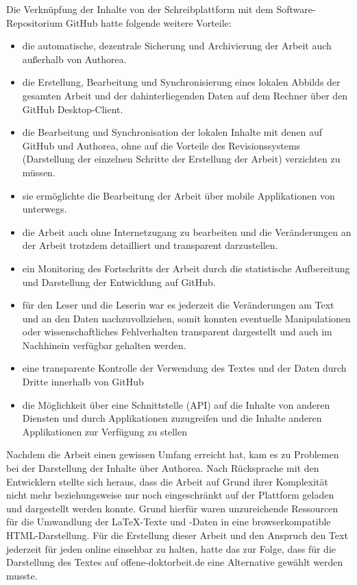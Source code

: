 Die Verknüpfung der Inhalte von der Schreibplattform mit dem Software-Repositorium GitHub hatte folgende weitere Vorteile:
\begin{itemize}
\item die automatische, dezentrale Sicherung und Archivierung der Arbeit auch außerhalb von Authorea.
\item die Erstellung, Bearbeitung und Synchronisierung eines lokalen Abbilds der gesamten Arbeit und der dahinterliegenden Daten auf dem Rechner über den GitHub Desktop-Client.
\item die Bearbeitung und Synchronisation der lokalen Inhalte mit denen auf GitHub und Authorea, ohne auf die Vorteile des Revisionssystems (Darstellung der einzelnen Schritte der Erstellung der Arbeit) verzichten zu müssen.
\item sie ermöglichte die Bearbeitung der Arbeit über mobile Applikationen von unterwegs.
\item die Arbeit auch ohne Internetzugang zu bearbeiten und die Veränderungen an der Arbeit trotzdem detailliert und transparent darzustellen.
\item ein Monitoring des Fortschritts der Arbeit durch die statistische Aufbereitung und Darstellung der Entwicklung auf GitHub.
\item für den Leser und die Leserin war es jederzeit die Veränderungen am Text und an den Daten nachzuvollziehen, somit konnten eventuelle Manipulationen oder wissenschaftliches Fehlverhalten transparent dargestellt und auch im Nachhinein verfügbar gehalten werden.
\item eine transparente Kontrolle der Verwendung des Textes und der Daten durch Dritte innerhalb von GitHub
\item die Möglichkeit über eine Schnittstelle (API) auf die Inhalte von anderen Diensten und durch Applikationen zuzugreifen und die Inhalte anderen Applikationen zur Verfügung zu stellen
\end{itemize}

Nachdem die Arbeit einen gewissen Umfang erreicht hat, kam es zu Problemen bei der Darstellung der Inhalte über Authorea. Nach Rücksprache mit den Entwicklern stellte sich heraus, dass die Arbeit auf Grund ihrer Komplexität nicht mehr beziehungsweise nur noch eingeschränkt auf der Plattform geladen und dargestellt werden konnte. Grund hierfür waren unzureichende Ressourcen für die Umwandlung der LaTeX-Texte und -Daten in eine browserkompatible HTML-Darstellung. Für die Erstellung dieser Arbeit und den Anspruch den Text jederzeit für jeden online einsehbar zu halten, hatte das zur Folge, dass für die Darstellung des Textes auf offene-doktorbeit.de eine Alternative gewählt werden musste.

